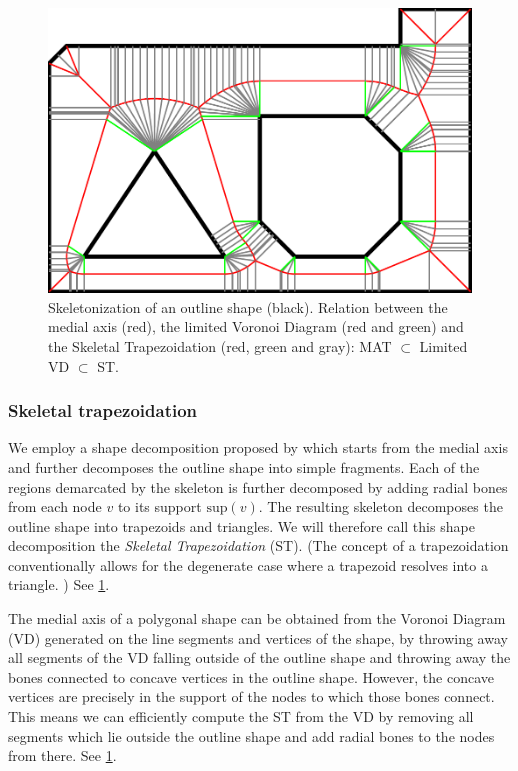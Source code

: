\begin{figure}
\includegraphics[width=\columnwidth]{sources/method/MAT_VD_VQ.pdf}
\caption{
Skeletonization of an outline shape (black).
Relation between the medial axis (red), the limited Voronoi Diagram (red and green) and the Skeletal Trapezoidation (red, green and gray): MAT $\subset$ Limited VD $\subset$ ST.
}
\label{skeletonization_comparison}
\end{figure}



\subsubsection{Skeletal trapezoidation}
We employ a shape decomposition proposed by \citeauthor{Ding2016a} which starts from the medial axis and further decomposes the outline shape into simple fragments. \cite{Ding2016a}
Each of the regions demarcated by the skeleton is further decomposed by adding radial bones from each node $v$ to its support $\text{sup}(v)$.
The resulting skeleton decomposes the outline shape into trapezoids and triangles.
We will therefore call this shape decomposition the \emph{Skeletal Trapezoidation} (ST).
(The concept of a trapezoidation conventionally allows for the degenerate case where a trapezoid resolves into a triangle. \cite{chazelle1984,fournier1984})
See \cref{skeletonization_comparison}.


The medial axis of a polygonal shape can be obtained from the Voronoi Diagram (VD) generated on the line segments and vertices of the shape, by throwing away all segments of the VD falling outside of the outline shape and throwing away the bones connected to concave vertices in the outline shape. \cite{lee1982medial}
However, the concave vertices are precisely in the support of the nodes to which those bones connect.
This means we can efficiently compute the ST from the VD by removing all segments which lie outside the outline shape and add radial bones to the nodes from there.
See \cref{skeletonization_comparison}.


